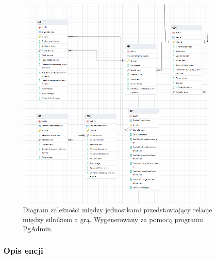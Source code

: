 \documentclass[12pt,a4paper]{article}
\begin{document}
\vspace{0.5cm}
\begin{figure}[h!]
    \centering
    \includegraphics[width=0.9\textwidth]{images/ERD_offline.png}
    \caption{Diagram zależności między jednostkami przedstawiający relacje między silnikiem a grą. Wygenerowany za pomocą programu PgAdmin.}
\end{figure}

\newpage

\subsubsection{Opis encji}
\end{document}
